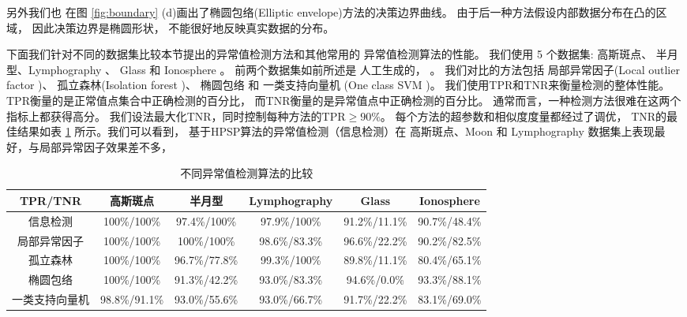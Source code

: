 另外我们也
在图 \ref{fig:boundary} (d)画出了椭圆包络\cite{rousseeuw1999fast}(Elliptic envelope)方法的决策边界曲线。
由于后一种方法假设内部数据分布在凸的区域，
因此决策边界是椭圆形状，
不能很好地反映真实数据的分布。

下面我们针对不同的数据集比较本节提出的异常值检测方法和其他常用的
异常值检测算法的性能。
我们使用 5 个数据集: 高斯斑点、 半月型、Lymphography
\cite{lazarevic2005feature}、 Glass 和 Ionosphere \cite{keller2012hics}。 
前两个数据集如前所述是
人工生成的，
\cite{campos2016evaluation}。
我们对比的方法包括
局部异常因子(Local outlier factor \citep{Breunig})、
孤立森林(Isolation forest \citep{if})、
椭圆包络  和
一类支持向量机 (One class SVM \citep{svm})。 
我们使用TPR和TNR来衡量检测的整体性能。
TPR衡量的是正常值点集合中正确检测的百分比，
而TNR衡量的是异常值点中正确检测的百分比。
通常而言，一种检测方法很难在这两个指标上都获得高分。
我们设法最大化TNR，同时控制每种方法的TPR$\geq 90\%$。
每个方法的超参数和相似度度量都经过了调优，
TNR的最佳结果如表 \ref{tab:odm} 所示。我们可以看到，
基于HPSP算法的异常值检测（信息检测）在 高斯斑点、Moon 和
Lymphography 数据集上表现最好，与局部异常因子效果差不多，
\begin{table}
  \begin{adjustbox}{width=\columnwidth,center}
\begin{tabular}{cccccc}
  \hline
         TPR/TNR        &  高斯斑点   &      半月型       &  Lymphography  &     Glass     &  Ionosphere   \\
  \hline
      信息检测    & 100\%/100\% & 97.4\%/100\%  & 97.9\%/100\% & 91.2\%/11.1\% & 90.7\%/48.4\% \\
      局部异常因子 & 100\%/100\% & 100\%/100\% & 98.6\%/83.3\%  & 96.6\%/22.2\% & 90.2\%/82.5\% \\
   孤立森林   & 100\%/100\% &  96.7\%/77.8\%  & 99.3\%/100\% & 89.8\%/11.1\% & 80.4\%/65.1\% \\
    椭圆包络   & 100\%/100\% &  91.3\%/42.2\%  & 93.0\%/83.3\%  & 94.6\%/0.0\%  & 93.3\%/88.1\% \\
     一类支持向量机     &  98.8\%/91.1\%  &  93.0\%/55.6\%  & 93.0\%/66.7\%  & 91.7\%/22.2\% & 83.1\%/69.0\% \\
  \hline
  \end{tabular}
\end{adjustbox}
\caption{不同异常值检测算法的比较}\label{tab:odm}
\end{table}

